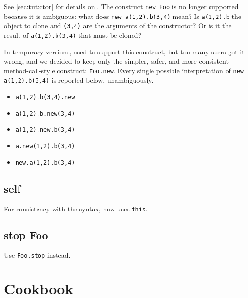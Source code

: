 See \autoref{sec:tut:ctor} for details on .  The construct
\lstinline{new Foo} is no longer supported because it is ambiguous:
what does \lstinline{new a(1,2).b(3,4)} mean?  Is
\lstinline{a(1,2).b} the object to clone and \lstinline{(3,4)} are the
arguments of the constructor?  Or is it the result of
\lstinline{a(1,2).b(3,4)} that must be cloned?

In temporary versions,  used to support this  construct,
but too many users got it wrong, and we decided to keep only the
simpler, safer, and more consistent method-call-style construct:
\lstinline{Foo.new}.  Every single possible interpretation of
\lstinline{new a(1,2).b(3,4)} is reported below, unambiguously.
\begin{itemize}
\item \lstinline{a(1,2).b(3,4).new}
\item \lstinline{a(1,2).b.new(3,4)}
\item \lstinline{a(1,2).new.b(3,4)}
\item \lstinline{a.new(1,2).b(3,4)}
\item \lstinline{new.a(1,2).b(3,4)}
\end{itemize}

\subsection{self}
For consistency with the \Cxx syntax, \us now uses \lstinline{this}.

\subsection{stop Foo}

Use \lstinline{Foo.stop} instead.

\section{Cookbook}


